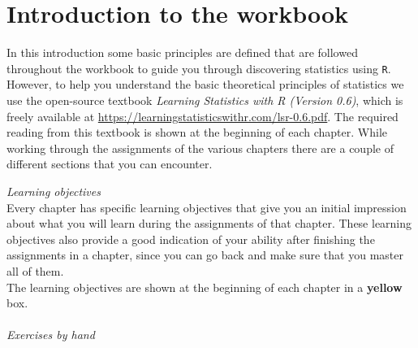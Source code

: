 \thispagestyle{emptyhead}

\section{Introduction to the workbook}

In this introduction some basic principles are defined that are followed throughout the workbook to guide you through discovering statistics using \texttt{R}. However, to help you understand the basic theoretical principles of statistics we use the open-source textbook \textit{Learning Statistics with R (Version 0.6)}, which is freely available at \url{https://learningstatisticswithr.com/lsr-0.6.pdf}. The required reading from this textbook is shown at the beginning of each chapter. While working through the assignments of the various chapters there are a couple of different sections that you can encounter. \\

\bigskip

\textit{Learning objectives} \\

Every chapter has specific learning objectives that give you an initial impression about what you will learn during the assignments of that chapter. These learning objectives also provide a good indication of your ability after finishing the assignments in a chapter, since you can go back and make sure that you master all of them. \\

The learning objectives are shown at the beginning of each chapter in a {\color{learningobjectives} \selectfont \textbf{yellow}} box. \\

\emptylearningobjectives \\

\textit{Exercises by hand} \\

